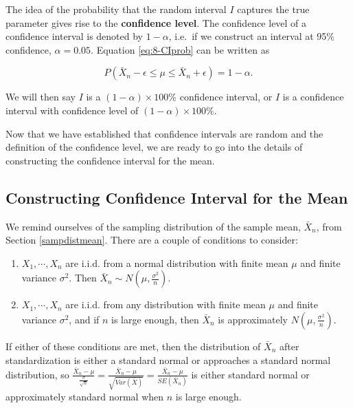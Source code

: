 \documentclass[
]{book}
\begin{document}
The idea of the probability that the random interval \(I\) captures the true parameter gives rise to the \textbf{confidence level}. The confidence level of a confidence interval is denoted by \(1-\alpha\), i.e.~if we construct an interval at 95\% confidence, \(\alpha=0.05\). Equation \eqref{eq:8-CIprob} can be written as

\begin{equation} 
P(\bar{X}_n - \epsilon \leq \mu \leq \bar{X}_n + \epsilon) = 1 - \alpha.
\label{eq:8-CIalpha}
\end{equation}

We will then say \(I\) is a \((1-\alpha) \times 100\%\) confidence interval, or \(I\) is a confidence interval with confidence level of \((1-\alpha) \times 100\%\).

Now that we have established that confidence intervals are random and the definition of the confidence level, we are ready to go into the details of constructing the confidence interval for the mean.

\hypertarget{constructing-confidence-interval-for-the-mean}{%
\subsection{Constructing Confidence Interval for the Mean}\label{constructing-confidence-interval-for-the-mean}}

We remind ourselves of the sampling distribution of the sample mean, \(\bar{X}_n\), from Section \ref{sampdistmean}. There are a couple of conditions to consider:

\begin{enumerate}
\def\labelenumi{\arabic{enumi}.}
\item
  \(X_1, \cdots, X_n\) are i.i.d. from a normal distribution with finite mean \(\mu\) and finite variance \(\sigma^2\). Then \(\bar{X}_n \sim N(\mu, \frac{\sigma^2}{n})\).
\item
  \(X_1, \cdots, X_n\) are i.i.d. from any distribution with finite mean \(\mu\) and finite variance \(\sigma^2\), and if \(n\) is large enough, then \(\bar{X}_n\) is approximately \(N(\mu, \frac{\sigma^2}{n})\).
\end{enumerate}

If either of these conditions are met, then the distribution of \(\bar{X}_n\) after standardization is either a standard normal or approaches a standard normal distribution, so \(\frac{\bar{X}_n - \mu}{\frac{\sigma}{\sqrt{n}}} = \frac{\bar{X}_n - \mu}{\sqrt{Var(\bar{X})}} = \frac{\bar{X}_n - \mu}{SE(\bar{X}_n)}\) is either standard normal or approximately standard normal when \(n\) is large enough.
\end{document}
